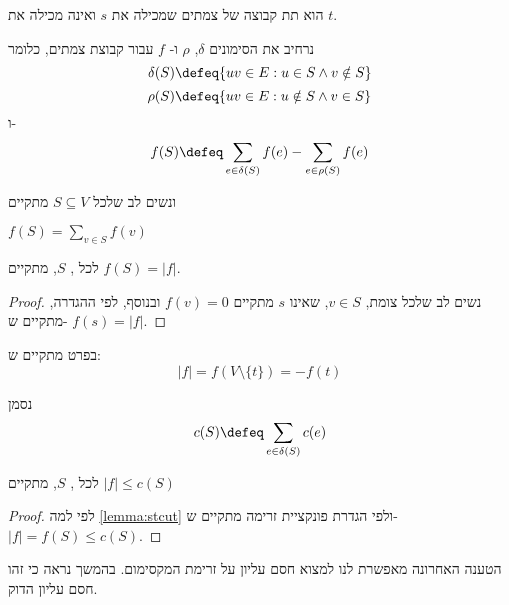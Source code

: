 \begin{definition}[\stcut]
\stcut{}
הוא תת קבוצה של צמתים שמכילה את $s$ ואינה מכילה את $t$.
\end{definition}

נרחיב את הסימונים 
$\delta$, $\rho$
ו-%
$f$
עבור קבוצת צמתים, כלומר
$$\delta(S) \defeq \{uv \in E : u \in S \land v \notin S\}$$
$$\rho(S) \defeq \{uv \in E : u \notin S \land v \in S\}$$
ו-%
$$f(S) \defeq \sum_{e \in \delta(S)} f(e) - \sum_{e \in \rho(S)} f(e)$$

ונשים לב שלכל 
$S \subseteq V$
מתקיים
\begin{observation}
$f(S) = \sum_{v \in S} f(v)$
\end{observation}

\begin{lemma}
\label{lemma:stcut}
לכל
\stcut, $S$,
מתקיים
$f(S) = |f|$.
\end{lemma}

\begin{proof}
נשים לב שלכל צומת, 
$v \in S$,
שאינו $s$ מתקיים 
$f(v) = 0$
ובנוסף, לפי ההגדרה, מתקיים ש-%
$f(s) = |f|$.
\end{proof}

בפרט מתקיים ש:%
$$
|f| = f(V \setminus \{t\}) = -f(t)
$$

נסמן
$$
c(S) \defeq \sum_{e \in \delta(S)} c(e)
$$

\begin{claim}
לכל 
\stcut, $S$,
מתקיים
$|f| \leq c(S)$
\end{claim}

\begin{proof}
לפי למה
\ref{lemma:stcut}
ולפי הגדרת פונקציית זרימה מתקיים ש-%
$|f| = f(S) \leq c(S)$.
\end{proof}

הטענה האחרונה מאפשרת לנו למצוא חסם עליון על זרימת המקסימום.
בהמשך נראה כי זהו חסם עליון הדוק.
